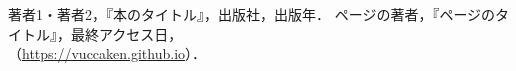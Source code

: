 \documentclass[uplatex,dvipdfmx]{vkaishi}
\begin{document}
\begin{thebibliography}{99}
   著者1・著者2，『本のタイトル』，出版社，出版年．
   ページの著者，『ページのタイトル』，最終アクセス日，\\
    （\url{https://vuccaken.github.io}）．
\end{thebibliography}
\end{document}
